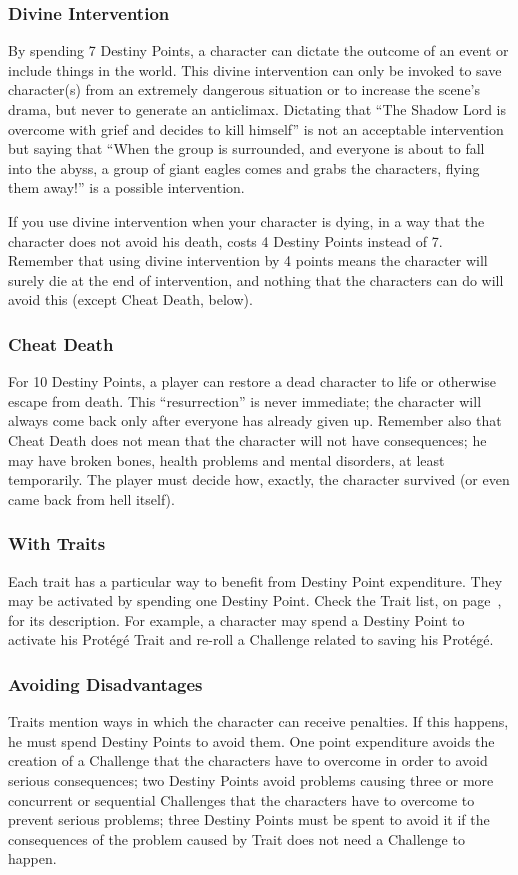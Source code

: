 \begin{multicols}{2}
\subsubsection{Divine Intervention}
By spending 7 Destiny Points, a character can dictate the outcome of an event or include things in the world. This divine intervention can only be invoked to save character(s) from an extremely dangerous situation or to increase the scene’s drama, but never to generate an anticlimax. Dictating that “The Shadow Lord is overcome with grief and decides to kill himself” is not an acceptable intervention but saying that “When the group is surrounded, and everyone is about to fall into the abyss, a group of giant eagles comes and grabs the characters, flying them away!” is a possible intervention. %

If you use divine intervention when your character is dying, in a way that the character does not avoid his death, costs 4 Destiny Points instead of 7. Remember that using divine intervention by 4 points means the character will surely die at the end of intervention, and nothing that the characters can do will avoid this (except Cheat Death, below).

\subsubsection{Cheat Death}
For 10 Destiny Points, a player can restore a dead character to life or otherwise escape from death. This “resurrection” is never immediate; the character will always come back only after everyone has already given up. Remember also that Cheat Death does not mean that the character will not have consequences; he may have broken bones, health problems and mental disorders, at least temporarily. The player must decide how, exactly, the character survived (or even came back from hell itself).

\subsubsection{With Traits}
Each trait has a particular way to benefit from Destiny Point expenditure. They may be activated by spending one Destiny Point. Check the Trait list, on page~\pageref{subsec:traits}, for its description. For example, a character may spend a Destiny Point to activate his Protégé Trait and re-roll a Challenge related to saving his Protégé. 

\subsubsection{Avoiding Disadvantages}
Traits mention ways in which the character can receive penalties. If this happens, he must spend Destiny Points to avoid them. One point expenditure avoids the creation of a Challenge that the characters have to overcome in order to avoid serious consequences; two Destiny Points avoid problems causing three or more concurrent or sequential Challenges that the characters have to overcome to prevent serious problems; three Destiny Points must be spent to avoid it if the consequences of the problem caused by Trait does not need a Challenge to happen.


\end{multicols}
